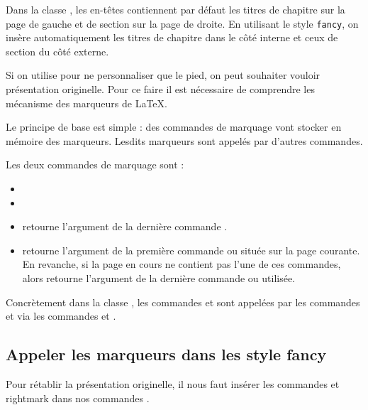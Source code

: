 Dans la classe , les en-têtes contiennent par défaut les titres de chapitre sur la page de gauche et de section sur la page de droite. En utilisant le style \verb|fancy|, on insère automatiquement les titres de chapitre dans le côté interne et ceux de section du côté externe. 

Si on utilise  pour ne personnaliser que le pied, on peut souhaiter vouloir présentation  originelle. Pour ce faire il est nécessaire de comprendre les mécanisme des marqueurs de \LaTeX. 

Le principe de base est simple : des commandes de marquage vont stocker en mémoire des marqueurs. Lesdits marqueurs sont appelés par d'autres commandes. 

Les deux commandes de marquage sont :
\begin{itemize}
\item {}
\item {}
\end{itemize}

\begin{itemize}
\item {} retourne l'argument  de la dernière commande .
\item {} retourne l'argument  de la première commande  ou   située sur la page courante. En revanche, si la page en cours ne contient pas l'une de ces commandes, alors  retourne l'argument  de la dernière commande  ou  utilisée.
\end{itemize}

Concrètement dans la classe , les commandes   et  sont appelées par les commandes  et  via les commandes  et . 

\subsection{Appeler les marqueurs dans les style fancy}

Pour rétablir la présentation originelle, il nous faut insérer les commandes  et {rightmark} dans nos commandes .

\begin{latexcode}
\fancyhead[LE,RO]{}
\fancyhead[RE]{\leftmark}
\fancyhead[LO]{\rightmark}
\end{latexcode}

